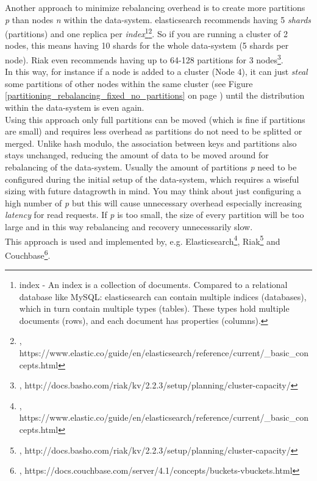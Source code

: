 {
\label{tf_dds_partitioning_rebalancing_fixed_no_partitions}
Another approach to minimize rebalancing overhead is to create more partitions \textit{p} than nodes \textit{n} within the data-system. elasticsearch recommends having 5 \textit{shards} (partitions) and one replica per \textit{index}\footnote{index - An index is a collection of documents. Compared to a relational database like MySQL: elasticsearch can contain multiple indices (databases), which in turn contain multiple types (tables). These types hold multiple documents (rows), and each document has properties (columns).}\footnote{\cite{ELSSIZ}, https://www.elastic.co/guide/en/elasticsearch/reference/current/\_basic\_concepts.html}. So if you are running a cluster of 2 nodes, this means having 10 shards for the whole data-system (5 shards per node). Riak even recommends having up to 64-128 partitions for 3 nodes\footnote{\cite{RIAKNOP}, http://docs.basho.com/riak/kv/2.2.3/setup/planning/cluster-capacity/}. \\
In this way, for instance if a node is added to a cluster (Node 4), it can just \textit{steal} some partitions of other nodes within the same cluster (see Figure \ref{partitioning_rebalancing_fixed_no_partitions} on page \pageref{partitioning_rebalancing_fixed_no_partitions}) until the distribution within the data-system is even again. \\
Using this approach only full partitions can be moved (which is fine if partitions are small) and requires less overhead as partitions do not need to be splitted or merged. Unlike hash modulo, the association between keys and partitions also stays unchanged, reducing the amount of data to be moved around for rebalancing of the data-system. Usually the amount of partitions \textit{p} need to be configured during the initial setup of the data-system, which requires a wiseful sizing with future datagrowth in mind. You may think about just configuring a high number of \textit{p} but this will cause unnecessary overhead especially increasing \textit{latency} for read requests. If \textit{p} is too small, the size of every partition will be too large and in this way rebalancing and recovery unnecessarily slow.\\
This approach is used and implemented by, e.g. Elasticsearch\footnote{\cite{ELSSIZ}, https://www.elastic.co/guide/en/elasticsearch/reference/current/\_basic\_concepts.html}, Riak\footnote{\cite{RIAKNOP}, http://docs.basho.com/riak/kv/2.2.3/setup/planning/cluster-capacity/} and Couchbase\footnote{\cite{CBVP}, https://docs.couchbase.com/server/4.1/concepts/buckets-vbuckets.html}.

}
